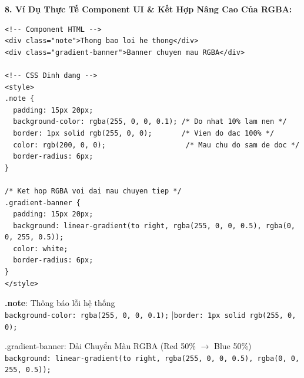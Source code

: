 \documentclass[11pt,oneside]{book}
\newcommand{\codeinline}[1]{\textcolor{accentOrange}{\texttt{#1}}}
\begin{document}
\textbf{8. Ví Dụ Thực Tế Component UI \& Kết Hợp Nâng Cao Của RGBA:}

\begin{codeWindow}
\begin{lstlisting}[language=HTML5]
<!-- Component HTML -->
<div class="note">Thong bao loi he thong</div>
<div class="gradient-banner">Banner chuyen mau RGBA</div>

<!-- CSS Dinh dang -->
<style>
.note {
  padding: 15px 20px;
  background-color: rgba(255, 0, 0, 0.1); /* Do nhat 10% lam nen */
  border: 1px solid rgb(255, 0, 0);       /* Vien do dac 100% */
  color: rgb(200, 0, 0);                   /* Mau chu do sam de doc */
  border-radius: 6px;
}

/* Ket hop RGBA voi dai mau chuyen tiep */
.gradient-banner {
  padding: 15px 20px;
  background: linear-gradient(to right, rgba(255, 0, 0, 0.5), rgba(0, 0, 255, 0.5));
  color: white;
  border-radius: 6px;
}
</style>
\end{lstlisting}
\end{codeWindow}

\begin{browserWindow}
\vspace{2pt}
\begin{tcolorbox}[
    enhanced,
    colback=red!8,
    colframe=red!80!black,
    arc=5pt, boxrule=0.8pt,
    top=8pt, bottom=8pt, left=12pt, right=12pt,
    fontupper=\sffamily\color{red!80!black}
]
  \textbf{.note}: Thông báo lỗi hệ thống\\
  {\small\codeinline{background-color: rgba(255, 0, 0, 0.1);} \quad|\quad \codeinline{border: 1px solid rgb(255, 0, 0);}}
\end{tcolorbox}

\vspace{4pt}

\begin{tcolorbox}[
    enhanced,
    interior style={left color=red!60, right color=blue!60},
    colframe=primaryBlue!40,
    arc=5pt, boxrule=0.6pt,
    top=8pt, bottom=8pt, left=12pt, right=12pt,
    fontupper=\sffamily\bfseries\color{white}
]
  \centering
  .gradient-banner: Dải Chuyển Màu RGBA (Red 50\% $\rightarrow$ Blue 50\%)\\
  {\small\normalfont\color{white!95}\codeinline{background: linear-gradient(to right, rgba(255, 0, 0, 0.5), rgba(0, 0, 255, 0.5));}}
\end{tcolorbox}
\end{browserWindow}
\end{document}
